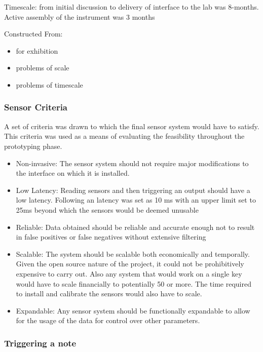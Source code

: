 Timescale: from initial discussion to delivery of interface to the 
lab was 8-months. Active assembly of the instrument was 3 months

Constructed From:

\begin{itemize}
\item
  for exhibition
\item
  problems of scale
\item
  problems of timescale
\end{itemize}

\subsubsection{Sensor Criteria}\label{sensor-criteria}

A set of criteria was drawn to which the final sensor system would have
to satisfy. This criteria was used as a means of evaluating the
feasibility throughout the prototyping phase.

\begin{itemize}
\item
  Non-invasive: The sensor system should not require major modifications
  to the interface on which it is installed.
\item
  Low Latency: Reading sensors and then triggering an output should have
  a low latency. Following \cite{Jack2016} an latency was set as 10 ms
  with an upper limit set to 25ms beyond which the sensors would be
  deemed unusable
\item
  Reliable: Data obtained should be reliable and accurate enough not to
  result in false positives or false negatives without extensive
  filtering
\item
  Scalable: The system should be scalable both economically and
  temporally. Given the open source nature of the project, it could not
  be prohibitively expensive to carry out. Also any system that would
  work on a single key would have to scale financially to potentially 50
  or more. The time required to install and calibrate the sensors would
  also have to scale.
\item
  Expandable: Any sensor system should be functionally expandable to
  allow for the usage of the data for control over other parameters.
\end{itemize}

\subsubsection{Triggering a note}\label{triggering-a-note}

